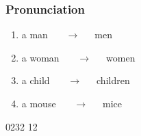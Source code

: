 \documentclass[aspectratio=169,xcolor={dvipsnames,table}]{beamer}
\newcommand{\myaudio}[1]{\href{#1}{\faVolumeUp}}
\begin{document}
\begin{frame}[plain]\frametitle{Pronunciation}

  \begin{enumerate}
    \item a man ~~~\pause{}$\longrightarrow$~~~men \pause
    \item a woman ~~~\pause{}$\longrightarrow$~~~women \pause
    \item a child ~~~\pause{}$\longrightarrow$~~~children \pause
    \item a mouse ~~~\pause{}$\longrightarrow$~~~mice 
  \end{enumerate}
  \pause

  \bigskip

  \bigskip

  \mbox{}\hfill{\tiny 0232}\,{\scriptsize \myaudio{./audio/005_singular_plural_12.mp3}}\,{\tiny 12}
\end{frame}
\end{document}
